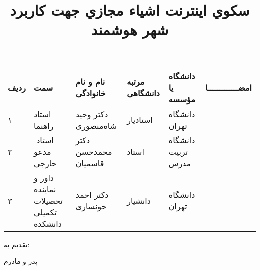 \subject{مهندسی برق}

\title{سكوي اينترنت اشياء مجازي جهت كاربرد شهر هوشمند}

\blankpage
\firstPage
\blankpage
\besmPage
\blankpage
\firstPage
\blankpage
\davaranPage
\leavevmode\thispagestyle{empty}
\begin{center}
\begin{tabular}{| p{8mm} | p{35mm} | p{} |p{14mm}|p{}|c|}
\hline
ردیف	& سمت                                                   & نام و نام خانوادگی                & مرتبه \newline دانشگاهی &	دانشگاه یا مؤسسه  &	امضـــــــــــــا\\
\hline
۱       & استاد راهنما				 & دکتر وحید شاه‌منصوری           & استاد‌یار                        & دانشگاه تهران          &  \\
\hline
۲       &‌ استاد مدعو خارجی			 & دکتر محمدحسن قاسمیان        & استاد                           & دانشگاه تربیت مدرس & \\
\hline
۳       & داور و نماینده تحصیلات تکمیلی دانشکده	 & دکتر احمد خونساری & دانشیار  & دانشگاه تهران                & \\
\hline
\end{tabular}
\end{center}
\esalatPage
\blankpage
\newpage\clearpage


\thispagestyle{empty}
{\Large تقدیم به:}\\
\begin{flushleft}
{\huge
پدر و مادرم
}
\end{flushleft}

